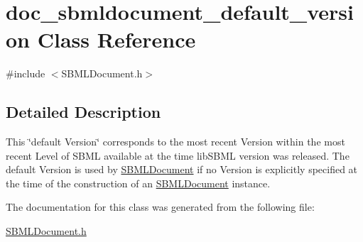 \hypertarget{classdoc__sbmldocument__default__version}{}\section{doc\+\_\+sbmldocument\+\_\+default\+\_\+version Class Reference}
\label{classdoc__sbmldocument__default__version}


{\ttfamily \#include $<$S\+B\+M\+L\+Document.\+h$>$}



\subsection{Detailed Description}
\begin{DoxyParagraph}{}
This \char`\"{}default Version\char`\"{} corresponds to the most recent Version within the most recent Level of S\+B\+ML available at the time lib\+S\+B\+ML version  was released. The default Version is used by \hyperlink{class_s_b_m_l_document}{S\+B\+M\+L\+Document} if no Version is explicitly specified at the time of the construction of an \hyperlink{class_s_b_m_l_document}{S\+B\+M\+L\+Document} instance. 
\end{DoxyParagraph}


The documentation for this class was generated from the following file\+:\begin{DoxyCompactItemize}
\item 
\hyperlink{_s_b_m_l_document_8h}{S\+B\+M\+L\+Document.\+h}\end{DoxyCompactItemize}
